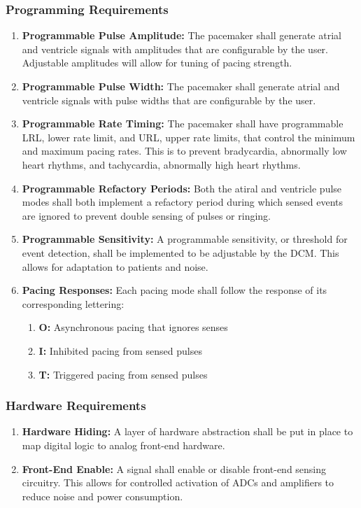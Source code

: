 \documentclass{article}
\begin{document}
\subsubsection{Programming Requirements}

\begin{enumerate}[label=]
    \item \textbf{Programmable Pulse Amplitude:} The pacemaker shall generate atrial and ventricle signals with amplitudes 
    that are configurable by the user. Adjustable amplitudes will allow for tuning of pacing strength.
    \item \textbf{Programmable Pulse Width:} The pacemaker shall generate atrial and ventricle signals with pulse widths 
    that are configurable by the user. 
    \item \textbf{Programmable Rate Timing:} The pacemaker shall have programmable LRL, lower rate limit, and URL,
    upper rate limits, that control the minimum and maximum pacing rates. This is to prevent bradycardia, abnormally low heart rhythms,
    and tachycardia, abnormally high heart rhythms. 
    \item \textbf{Programmable Refactory Periods:} Both the atiral and ventricle pulse modes shall both implement a 
    refactory period during which sensed events are ignored to prevent double sensing of pulses or ringing. 
    \item \textbf{Programmable Sensitivity:} A programmable sensitivity, or threshold for event detection, shall be implemented 
    to be adjustable by the DCM. This allows for adaptation to patients and noise. 
    \item \textbf{Pacing Responses:} Each pacing mode shall follow the response of its corresponding lettering:
    \begin{enumerate}[label=]
        \item \textbf{O:} Asynchronous pacing that ignores senses
        \item \textbf{I:} Inhibited pacing from sensed pulses
        \item \textbf{T:} Triggered pacing from sensed pulses
    \end{enumerate}
\end{enumerate}

\subsubsection{Hardware Requirements}

\begin{enumerate}[label=]
    \item \textbf{Hardware Hiding:} A layer of hardware abstraction shall be put in place to map digital logic 
    to analog front-end hardware. 
    \item \textbf{Front-End Enable:} A signal shall enable or disable front-end sensing circuitry. This allows for 
    controlled activation of ADCs and amplifiers to reduce noise and power consumption.
\end{enumerate}
\end{document}

